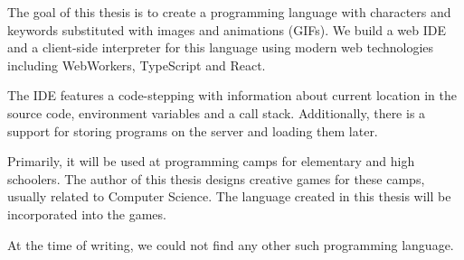 \documentclass[12pt]{report}
\begin{document}
The goal of this thesis is to create a programming language with characters and keywords substituted
with images and animations (GIFs). We build a web IDE and a client-side interpreter for this language
using modern web technologies including WebWorkers, TypeScript and React.

The IDE features a code-stepping with information about current location in the source
code, environment variables and a call stack. Additionally, there is a support for storing programs on the server
and loading them later.

Primarily, it will be used at programming camps for elementary and high schoolers. The author of this thesis designs
creative games for these camps, usually related to Computer Science. The language created in this thesis will
be incorporated into the games.

At the time of writing, we could not find any other such programming language.
\end{document}
